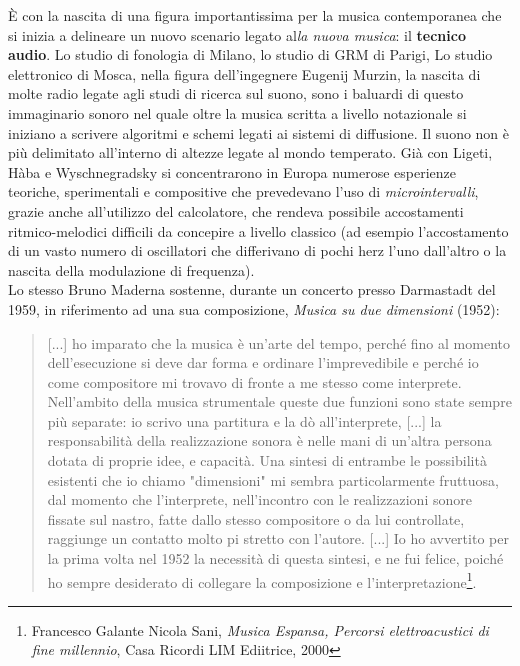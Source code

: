 \MakeUppercase{è} con la nascita di una figura importantissima per la musica contemporanea che si inizia a delineare un nuovo scenario legato al\textit{la nuova musica}: il \textbf{tecnico audio}. Lo studio di fonologia di Milano, lo studio di GRM di Parigi, Lo studio elettronico di Mosca, nella figura dell'ingegnere Eugenij Murzin, la nascita di molte radio legate agli studi di ricerca sul suono, sono i baluardi di questo immaginario sonoro nel quale oltre la musica scritta a livello notazionale si iniziano a scrivere algoritmi e schemi legati ai sistemi di diffusione. Il suono non è più delimitato all'interno di altezze legate al mondo temperato. Già con Ligeti, Hàba e Wyschnegradsky si concentrarono in Europa numerose esperienze teoriche, sperimentali e compositive che prevedevano l’uso di \textit{microintervalli}, grazie anche all'utilizzo del calcolatore, che rendeva possibile accostamenti ritmico-melodici difficili da concepire a livello classico (ad esempio l'accostamento di un vasto numero di oscillatori che differivano di pochi herz l'uno dall'altro o la nascita della modulazione di frequenza).\\
Lo stesso Bruno Maderna sostenne, durante un concerto presso Darmastadt del 1959, in riferimento ad una sua composizione, \textit{Musica su due dimensioni} (1952):

\begin{quotation}
[...] ho imparato che la musica è un'arte del tempo, perché fino al momento dell'esecuzione si deve dar forma e ordinare l'imprevedibile e perché io come compositore mi trovavo di fronte a me stesso come interprete. Nell'ambito della musica strumentale queste due funzioni sono state sempre più separate: io scrivo una partitura e la dò all'interprete, [...] la responsabilità della realizzazione sonora è nelle mani di un'altra persona dotata di proprie idee, e capacità. Una sintesi di entrambe le possibilità esistenti che io chiamo "dimensioni" mi sembra particolarmente fruttuosa, dal momento che l'interprete, nell'incontro con le realizzazioni sonore fissate sul nastro, fatte dallo stesso compositore o da lui controllate, raggiunge un contatto molto pi
 stretto con l'autore. [...] Io ho avvertito per la prima volta nel 1952 la necessità di questa sintesi, e ne fui felice, poiché ho sempre desiderato di collegare la composizione e l'interpretazione\footnote{Francesco Galante Nicola Sani, \textit{Musica Espansa, Percorsi elettroacustici di fine millennio}, Casa Ricordi LIM Ediitrice, 2000}.
\end{quotation}

